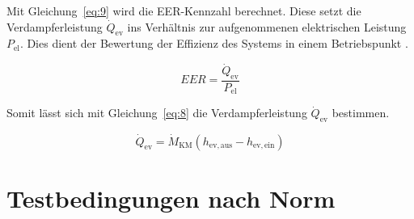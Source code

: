 Mit Gleichung~\ref{eq:9} wird die EER-Kennzahl berechnet. Diese setzt die Verdampferleistung  $\dot{Q}_{\mathrm{ev}}$ ins Verhältnis zur aufgenommenen elektrischen Leistung $P_{\mathrm{el}}$. Dies dient der Bewertung der Effizienz des Systems in einem Betriebspunkt \cite{Muller.2016}.


\begin{equation}
\label{eq:9}
EER = \frac{\dot{Q}_{\mathrm{ev}}}{P_{\mathrm{el}}}
\end{equation}

Somit lässt sich mit Gleichung~\ref{eq:8} die Verdampferleistung $\dot{Q}_{\mathrm{ev}}$ bestimmen.

\begin{equation}
\label{eq:8}
\dot{Q}_{\mathrm{ev}}= \dot{M}_{\mathrm{KM}}(h_{\mathrm{ev,aus}} - h_{\mathrm{ev,ein}})
\end{equation}




\section{Testbedingungen nach Norm}
\label{sec:Testbedingungen nach Norm}


